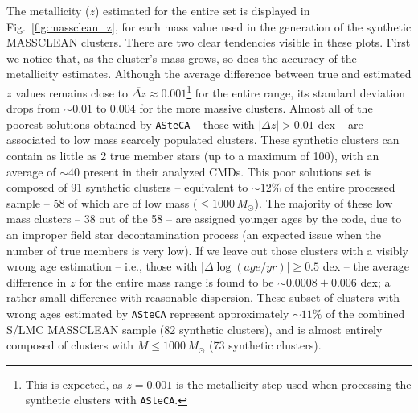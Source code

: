 \documentclass[draft]{aa}
\begin{document}
\begin{appendix}
The metallicity ($z$) estimated for the entire set is displayed in
Fig.~\ref{fig:massclean_z}, for each mass value used in the generation of the
synthetic MASSCLEAN clusters. There are two clear tendencies visible in these
plots.
%
First we notice that, as the cluster's mass grows, so does the accuracy of the
metallicity estimates. Although the average difference between true and
estimated $z$ values remains close to
$\overline{\Delta z}{\approx}0.001$\footnote{This is expected, as $z{=}0.001$
is the metallicity step used when processing the synthetic clusters with
\texttt{ASteCA}.} for the entire range, its standard deviation drops from $
{\sim}0.01$ to $0.004$ for the more massive clusters.
%
%
Almost all of the poorest solutions obtained by \texttt{ASteCA} -- those with
$|\Delta z|{>}0.01$ dex -- are associated to low mass scarcely populated
clusters. These synthetic clusters can contain as little as 2 true member stars
(up to a maximum of 100), with an average of ${\sim}40$ present in their
analyzed CMDs. This poor solutions set is composed of 91 synthetic clusters
-- equivalent to ${\sim}12\%$ of the entire processed sample -- 58 of which are
of low mass (${\le}1000\,M_{\odot}$).
%
The majority of these low mass clusters -- 38 out of the 58 -- are assigned
younger ages by the code, due to an improper field star decontamination process 
(an expected issue when the number of true members is very low).
%
If we leave out those clusters with a visibly wrong age estimation -- i.e.,
those with $|\Delta\log(age/yr)|{\ge}0.5$ dex -- the average difference in $z$
for the entire mass range is found to be ${\sim}0.0008{\pm}0.006$ dex; a rather
small difference with reasonable dispersion.
These subset of clusters with wrong ages estimated by \texttt{ASteCA} represent
approximately ${\sim}11\%$ of the combined S/LMC MASSCLEAN sample (82 synthetic
clusters), and is almost entirely composed of clusters with
$M{\le}1000\,M_{\odot}$ (73 synthetic clusters).


\end{appendix}
\end{document}
